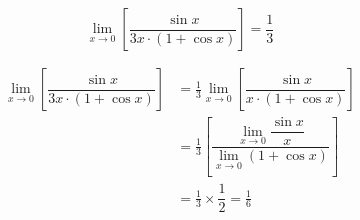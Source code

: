 \documentclass[14pt,fleqn]{extarticle}
\begin{document}
 

\[ \lim_{x\to 0} \left[ \dfrac{\sin x}{3 x\cdot(1+\cos x) }\right] = \frac{1}{3}\]
\newcard 

\begin{align}
\lim_{x\to 0} \left[ \dfrac{\sin x}{3 x\cdot(1+\cos x) }\right]  &= \frac{1}{3}\lim_{x\to 0} \left[ \dfrac{\sin x}{x\cdot (1+\cos x)}\right]  \\
&= \frac{1}{3} \left[ \dfrac{\lim_{x\to 0}\dfrac{\sin x}{x}}{\lim_{x\to 0}(1+\cos x)}\right]  \\
&= \frac{1}{3}\times \dfrac{1}{2} = \frac{1}{6}
\end{align}
\end{document}
